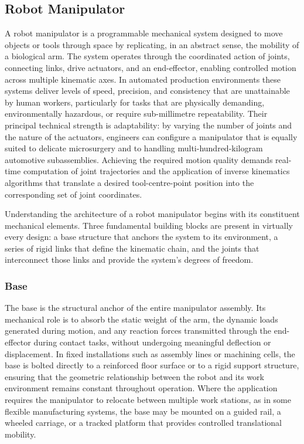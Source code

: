 \subsection{Robot Manipulator}
\hspace{1.27cm}
A robot manipulator is a programmable mechanical system designed to
move objects or tools through space by replicating, in an abstract
sense, the mobility of a biological arm. The system operates through
the coordinated action of joints, connecting links, drive actuators,
and an end-effector, enabling controlled motion across multiple
kinematic axes. In automated production environments these systems
deliver levels of speed, precision, and consistency that are
unattainable by human workers, particularly for tasks that are
physically demanding, environmentally hazardous, or require
sub-millimetre repeatability. Their principal technical strength is
adaptability: by varying the number of joints and the nature of the
actuators, engineers can configure a manipulator that is equally
suited to delicate microsurgery and to handling multi-hundred-kilogram
automotive subassemblies. Achieving the required motion quality demands
real-time computation of joint trajectories and the application of
inverse kinematics algorithms that translate a desired tool-centre-point
position into the corresponding set of joint coordinates.\par
\hspace{1.27cm}
Understanding the architecture of a robot manipulator begins with
its constituent mechanical elements. Three fundamental building
blocks are present in virtually every design: a base structure that
anchors the system to its environment, a series of rigid links that
define the kinematic chain, and the joints that interconnect those
links and provide the system's degrees of freedom.

\subsubsection{Base}
\hspace{1.27cm}
The base is the structural anchor of the entire manipulator assembly.
Its mechanical role is to absorb the static weight of the arm, the
dynamic loads generated during motion, and any reaction forces
transmitted through the end-effector during contact tasks, without
undergoing meaningful deflection or displacement. In fixed
installations such as assembly lines or machining cells, the base is
bolted directly to a reinforced floor surface or to a rigid support
structure, ensuring that the geometric relationship between the robot
and its work environment remains constant throughout operation. Where
the application requires the manipulator to relocate between multiple
work stations, as in some flexible manufacturing systems, the base may
be mounted on a guided rail, a wheeled carriage, or a tracked platform
that provides controlled translational mobility.

